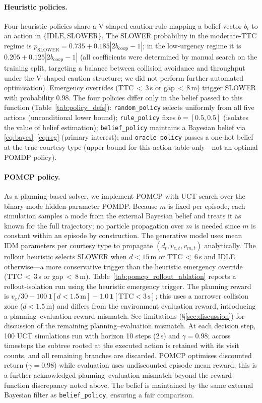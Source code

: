 \paragraph{Heuristic policies.}
Four heuristic policies share a V-shaped caution rule mapping a belief
vector $b_t$ to an action in $\{\text{IDLE},\text{SLOWER}\}$.
The SLOWER probability in the moderate-TTC regime is
$p_\text{SLOWER}{=}0.735{+}0.185|2b_\text{coop}{-}1|$; in the low-urgency
regime it is $0.205{+}0.125|2b_\text{coop}{-}1|$
(all coefficients were determined by manual search on the training split,
targeting a balance between collision avoidance and throughput under the
V-shaped caution structure; we did not perform further automated optimisation).
Emergency overrides (TTC\,$<$\,3\,s or gap\,$<$\,8\,m) trigger SLOWER with
probability 0.98.
The four policies differ only in the belief passed to this function
(Table~\ref{tab:policy_defs}): \texttt{random\_policy} selects uniformly
from all five actions (unconditional lower bound); \texttt{rule\_policy}
fixes $b{=}[0.5,0.5]$ (isolates the value of belief estimation);
\texttt{belief\_policy} maintains a Bayesian belief via
\eqref{eq:bayes}--\eqref{eq:reg} (primary interest); and
\texttt{oracle\_policy} passes a one-hot belief at the true courtesy type
(upper bound for this action table only---not an optimal POMDP policy).

\paragraph{POMCP policy.}
\label{sec:pomcp_policy}
As a planning-based solver, we implement POMCP \citep{silver2010pomcp} with
UCT search over the binary-mode hidden-parameter POMDP.
Because $m$ is fixed per episode, each simulation samples a mode from the
external Bayesian belief and treats it as known for the full trajectory;
no particle propagation over $m$ is needed since $m$ is constant within an
episode by construction.
The generative model uses mean IDM parameters per courtesy type to propagate
$(d_t, v_{e,t}, v_{m,t})$ analytically.
The rollout heuristic selects SLOWER when $d{<}15$\,m or TTC\,$<$\,6\,s
and IDLE otherwise---a more conservative trigger than the heuristic
emergency override (TTC\,$<$\,3\,s or gap\,$<$\,8\,m).
Table~\ref{tab:pomcp_rollout_ablation} reports a rollout-isolation run using
the heuristic emergency trigger.
The planning reward is $v_e/30 - 100\,\mathbf{1}[d{<}1.5\,\text{m}]
- 1.0\,\mathbf{1}[\text{TTC}{<}3\,\text{s}]$; this uses a narrower
collision zone ($d{<}1.5$\,m) and differs from the environment evaluation
reward, introducing a planning--evaluation reward mismatch.
See limitations (\S\ref{sec:discussion}) for discussion of the remaining
planning--evaluation mismatch.
At each decision step, 100 UCT simulations run with horizon 10 steps
(2\,s) and $\gamma{=}0.98$; across timesteps the subtree rooted at the
executed action is retained with its visit counts, and all remaining branches
are discarded.
POMCP optimises discounted return ($\gamma{=}0.98$) while evaluation uses
undiscounted episode mean reward; this is a further acknowledged
planning--evaluation mismatch beyond the reward-function discrepancy noted above.
The belief is maintained by the same external Bayesian filter as
\texttt{belief\_policy}, ensuring a fair comparison.

